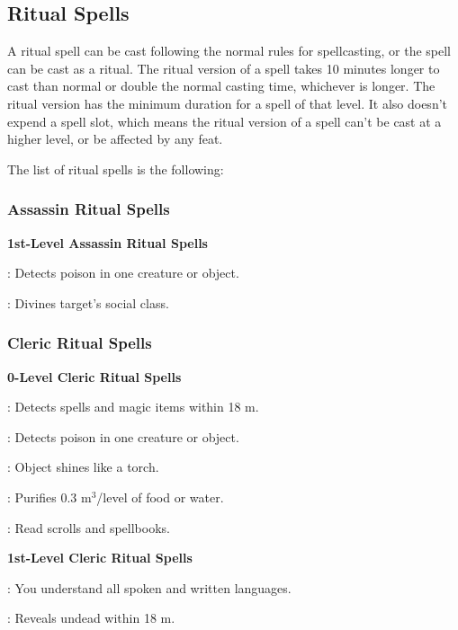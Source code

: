 \subsection{Ritual Spells}
A ritual spell can be cast following the normal rules for spellcasting, or the spell can be cast as a ritual. The ritual version of a spell takes 10 minutes longer to cast than normal or double the normal casting time, whichever is longer. The ritual version has the minimum duration for a spell of that level. It also doesn't expend a spell slot, which means the ritual version of a spell can't be cast at a higher level, or be affected by any feat.

The list of ritual spells is the following:

\subsubsection{Assassin Ritual Spells}
\noindent\textbf{1st-Level Assassin Ritual Spells}
\begin{itemize*}
	\item[] : Detects poison in one creature or object.
	\item[] : Divines target's social class. %
\end{itemize*}

\subsubsection{Cleric Ritual Spells}
\noindent\textbf{0-Level Cleric Ritual Spells}
\begin{itemize*}
	\item[] : Detects spells and magic items within 18 m.
	\item[] : Detects poison in one creature or object.
	\item[] : Object shines like a torch.
	\item[] : Purifies 0.3 m$^3$/level of food or water.
	\item[] : Read scrolls and spellbooks.
\end{itemize*}

\noindent\textbf{1st-Level Cleric Ritual Spells}
\begin{itemize*}
	\item[] : You understand all spoken and written languages.
	\item[] : Reveals undead within 18 m.
\end{itemize*}

